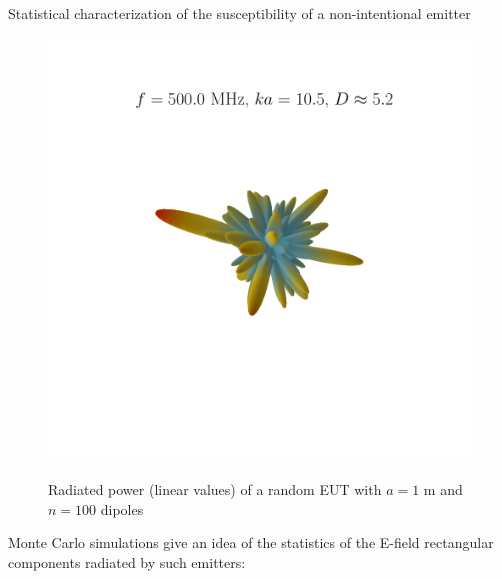 \documentclass[final,hyperref={pdfpagelabels=false}]{beamer}
\begin{document}
\begin{frame}{}
\begin{columns}[t]
\begin{column}{0.32\linewidth}
\begin{block}{{Statistical characterization of the susceptibility of a non-intentional emitter}}
\begin{figure}
{          \includegraphics[trim=110 180 90 120,clip,width=0.45\columnwidth]{./img/rp_124.png}} 
\vspace{-0.3cm}
    \large{\caption{Radiated power (linear values) of a random EUT with  $a=1$ m and $n=100$ dipoles}}
     \label{fig_diagsr}
\end{figure}
Monte Carlo simulations give an idea of the statistics of the E-field rectangular components radiated by such emitters:
\begin{figure}
     \centering
    \subfigure[$ka=2$, $n=4$]{
}
\end{figure}
\end{block}
\end{column}
\end{columns}
\end{frame}
\end{document}

